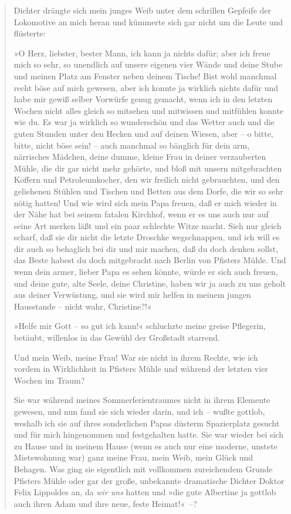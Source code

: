 \begin{verse}
Dichter drängte sich mein junges Weib unter dem schrillen Gepfeife
der Lokomotive an mich heran und kümmerte sich gar nicht um die
Leute und flüsterte:

»O Herz, liebster, bester Mann, ich kann ja nichts dafür; aber ich
freue mich so sehr, so unendlich auf unsere eigenen vier Wände und
deine Stube und meinen Platz am Fenster neben deinem Tische! Bist
wohl manchmal recht böse auf mich gewesen, aber ich konnte ja
wirklich nichts dafür und habe mir gewiß selber Vorwürfe genug
gemacht, wenn ich in den letzten Wochen nicht alles gleich so
mitsehen und mitwissen und mitfühlen konnte wie du. Es war ja
wirklich so wunderschön und das Wetter auch und die guten Stunden
unter den Hecken und auf deinen Wiesen, aber – o bitte, bitte,
nicht böse sein! – auch manchmal so bänglich für dein arm,
närrisches Mädchen, deine dumme, kleine Frau in deiner verzauberten
Mühle, die dir gar nicht mehr gehörte, und bloß mit unsern
mitgebrachten Koffern und Petroleumkocher, den wir freilich nicht
gebrauchten, und den geliehenen Stühlen und Tischen und Betten aus
dem Dorfe, die wir so sehr nötig hatten! Und wie wird sich mein
Papa freuen, daß er mich wieder in der Nähe hat bei seinem fatalen
Kirchhof, wenn er es uns auch nur auf seine Art merken läßt und ein
paar schlechte Witze macht. Sieh nur gleich scharf, daß sie dir
nicht die letzte Droschke wegschnappen, und ich will es dir auch so
behaglich bei dir und mir machen, daß du doch denken sollst, das
Beste habest du doch mitgebracht nach Berlin von Pfisters Mühle.
Und wenn dein armer, lieber Papa es sehen könnte, würde er sich
auch freuen, und deine gute, alte Seele, deine Christine, haben wir
ja auch zu uns geholt aus deiner Verwüstung, und sie wird mir
helfen in meinem jungen Hausstande – nicht wahr, Christine?!«

»Helfe mir Gott – so gut ich kann!« schluchzte meine greise
Pflegerin, betäubt, willenlos in das Gewühl der Großstadt
starrend.

Und mein Weib, meine Frau! War sie nicht in ihrem Rechte, wie ich
vordem in Wirklichkeit in Pfisters Mühle und während der letzten
vier Wochen im Traum?

Sie war während meines Sommerferientraumes nicht in ihrem Elemente
gewesen, und nun fand sie sich wieder darin, und ich – wußte
gottlob, weshalb ich sie auf ihres sonderlichen Papas düsterm
Spazierplatz gesucht und für mich hingenommen und festgehalten
hatte. Sie war wieder bei sich zu Hause und in meinem Hause (wenn
es auch nur eine moderne, unstete Mietswohnung war) ganz meine
Frau, mein Weib, mein Glück und Behagen. Was ging sie eigentlich
mit vollkommen zureichendem Grunde Pfisters Mühle oder gar der
große, unbekannte dramatische Dichter Doktor Felix Lippoldes an, da
\emph{wir uns} hatten und »die gute Albertine ja gottlob auch ihren
Adam und ihre neue, feste Heimat!«~–?


\end{verse}

